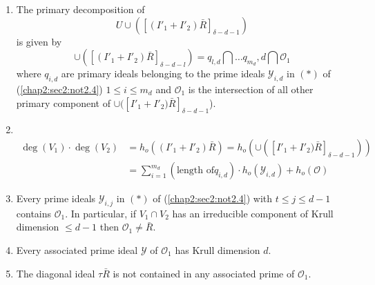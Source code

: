 \setcounter{lemma}{9}
\begin{lemma}\label{chap2:sec3:lem2.10}
\begin{enumerate}[\rm (i)]
\item The primary decomposition of 
$$
U\cup
  ([(I'_1+I'_2)\bar{R}]_{\delta-d-1})
$$ 
is given by\pageoriginale 
$$
  \cup ([(I'_1+I'_2)\bar{R}]_{\delta-d-l})=q_{l,d} \bigcap \ldots
  q_{m_d}, d \bigcap \mathscr{O}_1 
  $$
  where $q_{i, d}$ are primary ideals belonging to the prime ideals
  $\mathscr{Y}_{i,d}$ in $(*)$ of  (\ref{chap2:sec2:not2.4}) $1\leq i
  \leq m_d$ and 
  $\mathscr{O_1}$ is the intersection of all other primary component
  of $\cup ([I'_1+I'_2)\bar{R}]_{\delta-d-1} $). 
\item ~
\vskip -1.45cm
  \begin{align*}
    \deg (V_1)\cdot \deg (V_2) & = h_o ((I'_1 + I'_2)\bar{R})=h_o (\cup
    ([I'_1 + I'_2)\bar{R}]_{\delta-d-1}))\\ 
    & = \sum^{m_d}_{i=1} (\text {length of}q_{i,d})\cdot h_o
    (\mathscr{Y}_{i,d}) + h_o (\mathscr{O}) 
  \end{align*}
\item Every prime ideals $\mathscr{Y}_{i, j}$ in $(*)$ of
   (\ref{chap2:sec2:not2.4}) with $t \leq j \leq d-1$ contains $\mathscr{O}_1$. In
   particular, if $V_1\cap V_2$ has an irreducible component of Krull
   dimension $\leq d-1$ then $\mathscr{O}_1 \neq \bar{R}$. 
\item Every associated prime ideal $\mathscr{Y}$ of
  $\mathscr{O}_1$ has Krull dimension $d$. 
\item The diagonal ideal $\tau \bar{R}$ is not contained in
  any associated prime of $\mathscr{O}_1$. 
\end{enumerate}
\end{lemma}
 
